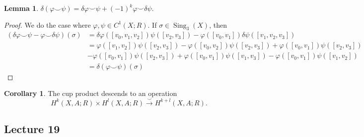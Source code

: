\documentclass[10pt,letterpaper,cm]{nupset}
\theoremstyle{definition}
\theoremstyle{theorem}
\newtheorem{lemma}[definition]{Lemma}
\newtheorem{corollary}[definition]{Corollary}
\theoremstyle{remark}
\newcommand{\1}{\mathbb{1}}
\newcommand{\0}{\vec 0}
\DeclareMathOperator{\sing}{Sing}
\begin{document}
\begin{lemma}
$\delta(\varphi \smile \psi) = \delta{\varphi} \smile \psi + ({-1})^k \varphi \smile \delta{\psi}$.
\end{lemma}
\begin{proof}
We do the case where $\varphi, \psi \in C^1(X;R)$. If $\sigma \in \sing_3(X)$, then
\begin{align*}
 \left(\delta{\varphi} \smile \psi - \varphi \smile \delta{\psi}\right)(\sigma) & =   \delta{\varphi}([v_0, v_1, v_2])\psi([v_2, v_3]) -  \varphi([v_0, v_1])\delta{\psi}([v_1, v_2, v_3])
 \\ & =  \varphi([v_1, v_2])\psi([v_2, v_3]) - \varphi([v_0, v_2])\psi([v_2, v_3])  + \varphi([v_0, v_1])\psi([v_2, v_3]) 
 \\ & - \varphi([v_0, v_1])\psi([v_2, v_3]) + \varphi([v_0, v_1])\psi([v_1, v_3]) - \varphi([v_0, v_1])\psi([v_1, v_2])  
 \\ & = \delta(\varphi \smile \psi)(\sigma)
\end{align*}
\end{proof}

\begin{corollary}
The cup product descends to an operation $$ H^k(X, A;R) \times H^l(X,A;R) \overset{\smile}{\longrightarrow} H^{k+l}(X,A; R)     .$$
\end{corollary}

\subsection{Lecture 19}
\end{document}
